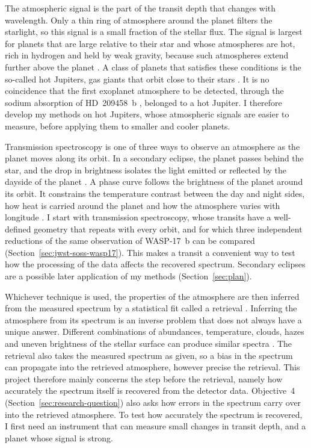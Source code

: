 The atmospheric signal is the part of the transit depth that changes with wavelength. Only a thin ring of atmosphere around the planet filters the starlight, so this signal is a small fraction of the stellar flux. The signal is
largest for planets that are large relative to their star and whose
atmospheres are hot, rich in hydrogen and held by weak gravity, because such
atmospheres extend further above the planet
\citep{SeagerSasselov2000,Brown2001}. A class of planets that satisfies these
conditions is the so-called hot Jupiters, gas giants that orbit close to their
stars \citep{Brown2001,Madhusudhan2019}. It is no coincidence that the first
exoplanet atmosphere to be detected, through the sodium absorption of
HD~209458~b \citep{CharbonneauEtAl2002}, belonged to a hot Jupiter. I therefore develop my methods on hot Jupiters, whose atmospheric signals are easier to measure, before applying them to smaller and cooler planets.

Transmission spectroscopy is one of three ways to observe an atmosphere as the
planet moves along its orbit. In a secondary eclipse, the planet passes behind
the star, and the drop in brightness isolates the light emitted or reflected by the dayside of the planet \citep{DemingEtAl2005,CoulombeEtAl2023,GressierEtAl2024}. A phase
curve follows the brightness of the planet around its orbit. It constrains the
temperature contrast between the day and night sides, how heat is carried
around the planet and how the atmosphere varies with longitude
\citep{KnutsonEtAl2007,MikalEvansEtAl2023,KemptonEtAl2023,SplinterEtAl2025}.
I start with transmission spectroscopy, whose transits have a well-defined geometry that repeats with every orbit, and for which three independent reductions of the same observation of WASP-17~b can be compared (Section~\ref{sec:jwst-soss-wasp17}). This makes a transit a convenient way to test how the processing of the data affects the recovered spectrum. Secondary
eclipses are a possible later application of my methods
(Section~\ref{sec:plan}).

Whichever technique is used, the properties of the atmosphere are then
inferred from the measured spectrum by a statistical fit called a retrieval
\citep{BarstowHeng2020}. Inferring the atmosphere from its spectrum is an inverse problem that does not always have a unique answer. Different combinations of abundances, temperature, clouds, hazes and uneven brightness of the stellar surface can produce similar spectra \citep{RackhamEtAl2018,Madhusudhan2019}. The retrieval also takes the measured
spectrum as given, so a bias in the spectrum can propagate into the retrieved atmosphere, however precise the retrieval. This project therefore mainly
concerns the step before the retrieval, namely how accurately the spectrum
itself is recovered from the detector data. Objective~4
(Section~\ref{sec:research-question}) also asks how errors in the spectrum
carry over into the retrieved atmosphere. To test how accurately the spectrum is recovered, I first need an instrument that can measure small changes in transit depth, and a planet whose
signal is strong. 

